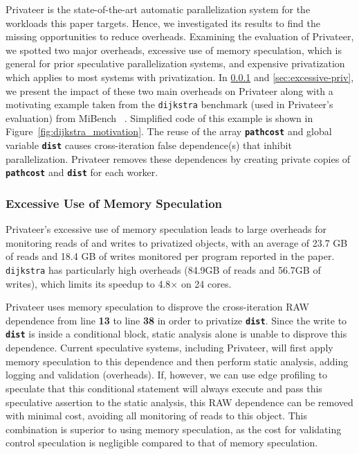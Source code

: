 Privateer is the state-of-the-art automatic parallelization system for the
workloads this paper targets. Hence, we investigated its results to find
the missing opportunities to reduce overheads.
%
Examining the evaluation of Privateer, we spotted two major overheads,
excessive use of memory speculation, which is general for prior speculative
parallelization systems, and expensive privatization which applies to
most systems with privatization.
%
In \ref{sec:excessive-memory-spec} and \ref{sec:excessive-priv}, we present
the impact of these two main overheads on Privateer along with a motivating
example taken from the \texttt{dijkstra} benchmark (used in Privateer's
evaluation) from MiBench ~\cite{guthaus:2001:iiwsc}. Simplified code of this example is
shown in Figure~\ref{fig:dijkstra_motivation}. The reuse of the array
\texttt{\textbf{pathcost}} and global variable \texttt{\textbf{dist}}
causes cross-iteration false dependence(s) that inhibit parallelization.
Privateer removes these dependences by creating private copies of
\texttt{\textbf{pathcost}} and \texttt{\textbf{dist}} for each worker.

\subsubsection{Excessive Use of Memory Speculation}
\label{sec:excessive-memory-spec}

Privateer's excessive use of memory speculation leads to large overheads
for monitoring reads of and writes to privatized objects, with an average
of 23.7 GB of reads and 18.4 GB of writes monitored per program reported in
the paper. \texttt{dijkstra} has particularly high overheads (84.9GB of
reads and 56.7GB of writes), which limits its speedup to 4.8$\times$ on 24
cores.


Privateer uses memory speculation to disprove the cross-iteration
RAW dependence from line \textbf{13} to line \textbf{38} in order to
privatize \texttt{\textbf{dist}}. Since the write to \texttt{\textbf{dist}}
is inside a conditional block, static analysis alone is unable to disprove
this dependence. Current speculative systems, including Privateer, will
first apply memory speculation to this dependence and then perform static
analysis, adding logging and validation (overheads). If, however, we can
use edge profiling to speculate that this conditional statement will always
execute and pass this speculative assertion to the static analysis, this
RAW dependence can be removed with minimal cost, avoiding all monitoring of
reads to this object. This combination is superior to using memory
speculation, as the cost for validating control speculation is negligible
compared to that of memory speculation.

